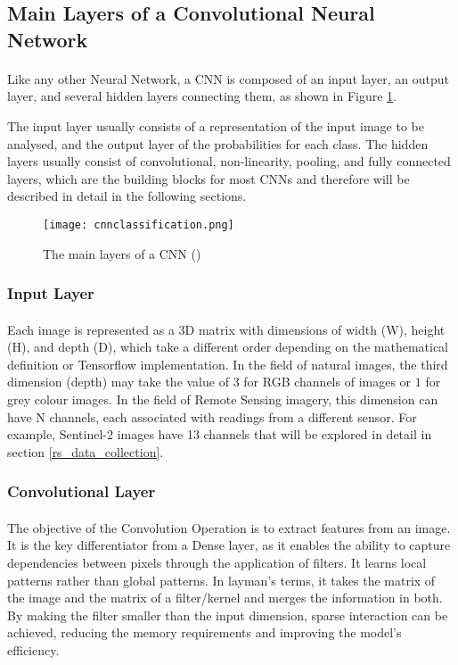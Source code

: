 \subsection{Main Layers of a Convolutional Neural Network} \label{cnn_layers}
\paragraph{}
Like any other Neural Network, a \gls{CNN} is composed of an input layer, an output layer, and several hidden layers connecting them, as shown in Figure \ref{fig_cnn_layers}.

The input layer usually consists of a representation of the input image to be analysed, and the output layer of the probabilities for each class.
The hidden layers usually consist of convolutional, non-linearity, pooling, and fully connected layers, which are the building blocks for most \gls{CNN}s and therefore will be described in detail in the following sections.

    \begin{figure}[hbt!]
        \centering
        \texttt{[image: cnnclassification.png]}
        \caption{The main layers of a CNN (\cite{10.6109/JICCE.2018.16.3.173})}
        \label{fig_cnn_layers}
    \end{figure}

\subsubsection{Input Layer}
\paragraph{}
Each image is represented as a 3D matrix with dimensions of width (W), height (H), and depth (D), which take a different order depending on the mathematical definition or Tensorflow implementation. In the field of natural images, the third dimension (depth) may take the value of $3$ for \gls{RGB} channels of images or $1$ for grey colour images. In the field of Remote Sensing imagery, this dimension can have N channels, each associated with readings from a different sensor. For example, Sentinel-2 images have 13 channels that will be explored in detail in section \ref{rs_data_collection}. 

\subsubsection{Convolutional Layer}
\paragraph{}
The objective of the Convolution Operation is to extract features from an image. It is the key differentiator from a Dense layer, as it enables the ability to capture dependencies between pixels through the application of filters. It learns local patterns rather than global patterns.
In layman's terms, it takes the matrix of the image and the matrix of a filter/kernel and merges the information in both. By making the filter smaller than the input dimension, sparse interaction can be achieved, reducing the memory requirements and improving the model's efficiency.

